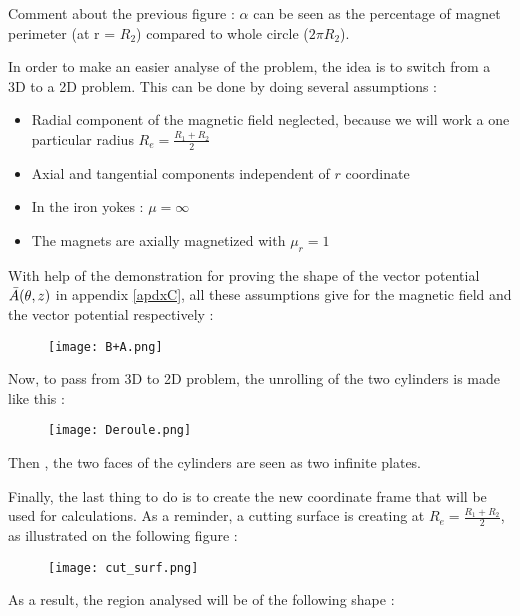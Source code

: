 Comment about the previous figure : $\alpha$ can be seen as the percentage of magnet perimeter (at r = $R_2$) compared to whole circle ($2\pi R_2$). 

\bigskip

In order to make an easier analyse of the problem, the idea is to switch from a 3D to a 2D problem. This can be done by doing several assumptions : 

\begin{itemize}
    \item Radial component of the magnetic field neglected, because we will work a one particular radius $R_e = \frac{R_1 + R_2}{2}$
    \item Axial and tangential components independent of $r$ coordinate
    \item In the iron yokes : $\mu = \infty$
    \item The magnets are axially magnetized with $\mu_r = 1$
\end{itemize}

With help of the demonstration for proving the shape of the vector potential $\Bar{A}(\theta,z)$ in appendix \ref{apdxC}, all these assumptions give for the magnetic field and the vector potential respectively :

\begin{figure}[H]
    \centering
  \texttt{[image: B+A.png]}
\end{figure}

Now, to pass from 3D to 2D problem, the unrolling of the two cylinders is made like this :

\begin{figure}[H]
    \centering
  \texttt{[image: Deroule.png]}
\end{figure}

Then , the two faces of the cylinders are seen as two infinite plates.

\bigskip

Finally, the last thing to do is to create the new coordinate frame that will be used for calculations. As a reminder, a cutting surface is creating at $R_e = \frac{R_1 + R_2}{2}$, as illustrated on the following figure : 


\begin{figure}[H]
    \centering
    \texttt{[image: cut\_surf.png]}
\end{figure}

As a result, the region analysed will be of the following shape : 


